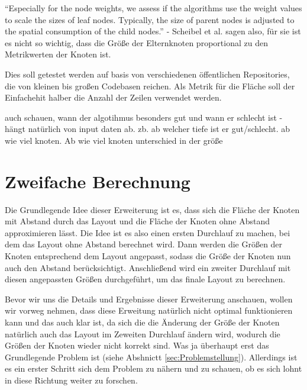 \enquote{Especially for the node weights, we assess if the algorithms use the weight values to scale the sizes of leaf nodes. Typically, the size of parent nodes is adjusted to the spatial consumption of the child nodes.}\cite[3]{scheibel2020survey} - Scheibel et al. sagen also, für sie ist es nicht so wichtig, dass die Größe der Elternknoten proportional zu den Metrikwerten der Knoten ist.

Dies soll getestet werden auf basis von verschiedenen öffentlichen Repositories, die von kleinen bis großen Codebasen reichen. Als Metrik für die Fläche soll der Einfachehit halber die Anzahl der Zeilen verwendet werden.

auch schauen, wann der algotihmus besonders gut und wann er schlecht ist - hängt natürlich von input daten  ab. zb. ab welcher tiefe ist er gut/schlecht. ab wie viel knoten. Ab wie viel knoten unterschied in der größe

\section{Zweifache Berechnung} \label{sec:ZweifachBerechnung}


Die Grundlegende Idee dieser Erweiterung ist es, dass sich die Fläche der Knoten mit Abstand durch das Layout und die Fläche der Knoten ohne Abstand approximieren lässt. Die Idee ist es also einen ersten Durchlauf zu machen, bei dem das Layout ohne Abstand berechnet wird. Dann werden die Größen der Knoten entsprechend dem Layout angepasst, sodass die Größe der Knoten nun auch den Abstand berücksichtigt. Anschließend wird ein zweiter Durchlauf mit diesen angepassten Größen durchgeführt, um das finale Layout zu berechnen.

Bevor wir uns die Details und Ergebnisse dieser Erweiterung anschauen, wollen wir vorweg nehmen, dass diese Erweitung natürlich nicht optimal funktionieren kann und das auch klar ist, da sich die die Änderung der Größe der Knoten natürlich auch das Layout im Zeweiten Durchlauf ändern wird, wodurch die Größen der Knoten wieder nicht korrekt sind. Was ja überhaupt erst das Grundlegende Problem ist (siehe Abshnictt \ref{sec:Problemstellung}). Allerdings ist es ein erster Schritt sich dem Problem zu nähern und zu schauen, ob es sich lohnt in diese Richtung weiter zu forschen.

